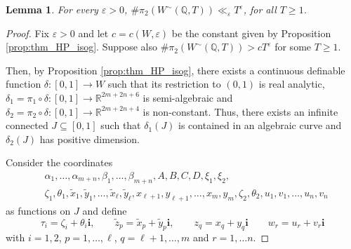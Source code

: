 \documentclass[11pt,a4paper,reqno]{amsart}
\numberwithin{equation}{section}
\newcommand{\Q}{\mathbb{Q}}
\newcommand{\R}{\mathbb{R}}
\renewcommand{\a}{\alpha}
\renewcommand{\b}{\beta}
\renewcommand{\d}{\delta}
\newcommand{\eps}{\varepsilon}
\renewcommand{\i}{\mathbf{i}}
\newcommand{\pt}[1]{\left( #1 \right)}
\newcommand{\pq}[1]{\left[ #1 \right]}
\newtheorem{lemma}[theorem]{Lemma}
\theoremstyle{remark}
\theoremstyle{definition}
\theoremstyle{definition}
\begin{document}
\begin{lemma}\label{lemma:bound_ll_Teps_isog}
For every $\eps>0$, $\# \pi_2\pt{W^{\sim}(\Q,T)}\ll_{\eps} T^{\eps}$, for all $T\geq 1$.
\end{lemma}
\begin{proof}
Fix $\eps > 0$ and let $c=c(W,\eps)$ be the constant given by Proposition \ref{prop:thm_HP_isog}. Suppose also $\# \pi_2\pt{W^{\sim}(\Q,T)}>c T^{\eps}$ for some $T\geq 1$. 

Then, by Proposition \ref{prop:thm_HP_isog}, there exists a continuous definable function $ \delta: \left[0,1 \right] \rightarrow W$ such that its restriction to $(0,1)$ is real analytic, $\d_1=\pi_1 \circ \d:\pq{0,1} \rightarrow \R^{2m+2n+6}$ is semi-algebraic and $\d_2=\pi_2 \circ \d:\pq{0,1} \rightarrow \R^{2m+2n+4}$ is non-constant. Thus, there exists an infinite connected $J \subseteq \pq{0,1}$ such that $\d_1(J)$ is contained in an algebraic curve and $\d_2(J)$ has positive dimension.

Consider the coordinates 
\begin{align*}
&\a_{1}, \ldots, \a_{m+n},\b_{1}, \ldots, \b_{m+n}, A,B,C,D, \xi_1, \xi_2,\\
 &\zeta_1, \theta_1, \widetilde{x}_1, \widetilde{y}_1, \ldots,\widetilde{x}_{\ell}, \widetilde{y}_{\ell}, x_{\ell+1}, y_{\ell+1}, \ldots, x_m, y_m,\zeta_2, \theta_2, u_1, v_1, \ldots, u_n, v_n
\end{align*}
as functions on $J$ and define
$$\tau_{i}=\zeta_{i}+ \theta_{i} \i, \qquad \widetilde{z}_{p}=\widetilde{x}_{p}+\widetilde{y}_{p} \i, \qquad z_{q}=x_{q}+y_{q} \i \qquad w_{r}=u_{r}+v_{r} \i$$
with $i=1,2$, $p=1, \ldots, \ell$, $q=\ell+1, \ldots, m$ and $r=1, \ldots n$.


\end{proof}
\end{document}
